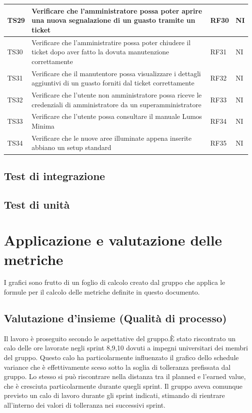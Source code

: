 \documentclass[12pt]{article}
\begin{document}
\begin{xltabular}{\linewidth}{|>{\hsize}X|>{\hsize}X|>{\hsize}X|>{\hsize}X|}
	\hline						
	TS29	 & Verificare che l'amministratore possa poter aprire una nuova segnalazione di un guasto tramite un ticket	&	RF30	&	NI	\\
	\hline						
	TS30	 & Verificare che l'amministratire possa poter chiudere il ticket dopo aver fatto la dovuta manutenzione correttamente	&	RF31	&	NI	\\
	\hline						
	TS31	 & Verificare che il manutentore possa visualizzare i dettagli aggiuntivi di un guasto forniti dal ticket correttamente	&	RF32	&	NI	\\
	\hline						
	TS32	 & Verificare che l'utente non amministratore possa riceve le credenziali di amministratore da un superamministratore	&	RF33	&	NI	\\
	\hline						
	TS33	 & Verificare che l'utente possa consultare il manuale Lumos Minima	&	RF34	&	NI	\\
	\hline						
	TS34	 & Verificare che le nuove aree illuminate appena inserite abbiano un setup standard	&	RF35	&	NI	\\
							
	\end{xltabular}						

\subsection{Test di integrazione}

\subsection{Test di unità}

\section {Applicazione e valutazione delle metriche}
I grafici sono frutto di un foglio di calcolo creato dal gruppo che applica le formule per il calcolo delle metriche definite in questo documento.

\subsection{Valutazione d’insieme (Qualità di processo)}
Il lavoro è proseguito secondo le aspettative del gruppo.È stato riscontrato un calo delle ore lavorate negli sprint 8,9,10 dovuti a impegni universitari dei membri del gruppo. Questo calo ha particolarmente influenzato il grafico dello schedule variance che è effettivamente sceso sotto la soglia di tolleranza prefissata dal gruppo. Lo stesso si può riscontrare nella distanza tra il planned e l’earned value, che è cresciuta particolarmente durante quegli sprint. Il gruppo aveva comunque previsto un calo di lavoro durante gli sprint indicati, stimando di rientrare all’interno dei valori di tolleranza nei successivi sprint. 
\end{document}
